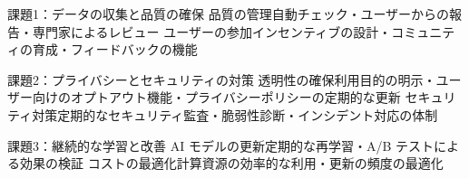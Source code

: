 \documentclass[aspectratio=169]{beamer}
\begin{document}
\begin{frame}{課題1：データの収集と品質の確保}
{品質の管理}{自動チェック・ユーザーからの報告・専門家によるレビュー}
{ユーザーの参加}{インセンティブの設計・コミュニティの育成・フィードバックの機能}
\end{frame}

\begin{frame}{課題2：プライバシーとセキュリティの対策}
{透明性の確保}{利用目的の明示・ユーザー向けのオプトアウト機能・プライバシーポリシーの定期的な更新}
{セキュリティ対策}{定期的なセキュリティ監査・脆弱性診断・インシデント対応の体制}
\end{frame}

\begin{frame}{課題3：継続的な学習と改善}
{AI モデルの更新}{定期的な再学習・A/B テストによる効果の検証}
{コストの最適化}{計算資源の効率的な利用・更新の頻度の最適化}
\end{frame}



\end{document}
